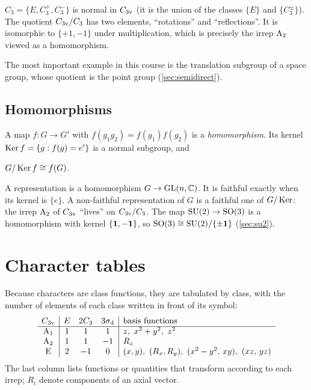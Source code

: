 \begin{example}
$C_3=\{E,C_3^+,C_3^-\}$ is normal in $C_{3\mathrm{v}}$ (it is the union of the classes $\{E\}$
and $\{C_3^\pm\}$). The quotient $C_{3\mathrm{v}}/C_3$ has two elements, ``rotations'' and
``reflections''. It is isomorphic to $\{+1,-1\}$ under multiplication, which is
precisely the irrep $\mathrm{A}_2$ viewed as a homomorphism.
\end{example}
The most important example in this course is the translation subgroup of a space
group, whose quotient is the point group (\cref{sec:semidirect}).

\subsection{Homomorphisms}
A map $f\colon G\to G'$ with $f(g_1g_2)=f(g_1)f(g_2)$ is a \emph{homomorphism}. Its
kernel $\operatorname{Ker} f=\{g:f(g)=e'\}$ is a normal subgroup, and
\begin{theorem}
$G/\operatorname{Ker} f\cong f(G)$.
\end{theorem}
A representation is a homomorphism $G\to\mathrm{GL}(n,\mathbb{C})$. It is faithful exactly when
its kernel is $\{e\}$. A non-faithful representation of $G$ is a faithful one of
$G/\operatorname{Ker}$: the irrep $\mathrm{A}_2$ of $C_{3\mathrm{v}}$ ``lives'' on $C_{3\mathrm{v}}/C_3$. The map
$\mathrm{SU}(2)\to\mathrm{SO}(3)$ is a homomorphism with kernel $\{\bm{1},-\bm{1}\}$, so
$\mathrm{SO}(3)\cong\mathrm{SU}(2)/\{\pm\bm{1}\}$ (\cref{sec:su2}).

\section{Character tables}

Because characters are class functions, they are tabulated by class, with the number
of elements of each class written in front of its symbol:
\begin{equation}\label{eq:C3vchar}
\begin{array}{c|ccc|l}
\Cv{3} & E & 2C_3 & 3\sd & \text{basis functions}\\\hline
\irr{A}_1 & 1 & 1 & 1 & z,\ x^2+y^2,\ z^2\\
\irr{A}_2 & 1 & 1 & -1 & R_z\\
\irr{E} & 2 & -1 & 0 & (x,y),\ (R_x,R_y),\ (x^2-y^2,\,xy),\ (xz,\,yz)
\end{array}
\end{equation}
The last column lists functions or quantities that transform according to each irrep;
$R_i$ denote components of an axial vector.

